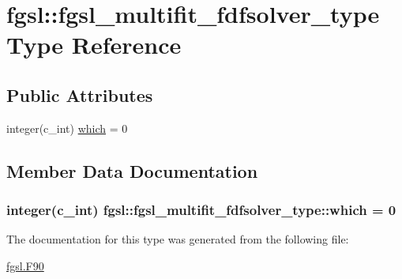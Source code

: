 \hypertarget{structfgsl_1_1fgsl__multifit__fdfsolver__type}{\section{fgsl\-:\-:fgsl\-\_\-multifit\-\_\-fdfsolver\-\_\-type Type Reference}
\label{structfgsl_1_1fgsl__multifit__fdfsolver__type}
}
\subsection*{Public Attributes}
\begin{DoxyCompactItemize}
\item 
integer(c\-\_\-int) \hyperlink{structfgsl_1_1fgsl__multifit__fdfsolver__type_adba3a5bb930ece74f35ee9c9b9598518}{which} = 0
\end{DoxyCompactItemize}


\subsection{Member Data Documentation}
\hypertarget{structfgsl_1_1fgsl__multifit__fdfsolver__type_adba3a5bb930ece74f35ee9c9b9598518}{
\subsubsection[{which}]{\setlength{\rightskip}{0pt plus 5cm}integer(c\-\_\-int) fgsl\-::fgsl\-\_\-multifit\-\_\-fdfsolver\-\_\-type\-::which = 0}}\label{structfgsl_1_1fgsl__multifit__fdfsolver__type_adba3a5bb930ece74f35ee9c9b9598518}


The documentation for this type was generated from the following file\-:\begin{DoxyCompactItemize}
\item 
\hyperlink{fgsl_8F90}{fgsl.\-F90}\end{DoxyCompactItemize}
